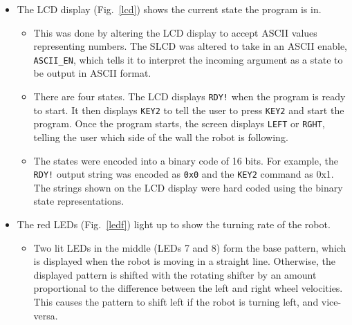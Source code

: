 \begin{itemize}
\item The LCD display (Fig.~\ref{lcd}) shows the current state the program is in.
  \begin{itemize}
  \item This was done by altering the LCD display to accept ASCII
    values representing numbers. The SLCD was altered to take in an
    ASCII enable, \verb+ASCII_EN+, which tells it to interpret the
    incoming argument as a state to be output in ASCII format.
  \item There are four states. The LCD displays \verb+RDY!+ when the
    program is ready to start. It then displays \verb+KEY2+ to tell
    the user to press \verb+KEY2+ and start the program. Once the
    program starts, the screen displays \verb+LEFT+ or \verb+RGHT+,
    telling the user which side of the wall the robot is following.
  \item The states were encoded into a binary code of 16 bits. For
    example, the \verb+RDY!+ output string was encoded as \verb+0x0+ and the
    \verb+KEY2+ command as 0x1. The strings shown on the LCD display
    were hard coded using the binary state representations.
  \end{itemize}

\begin{figure}[h!]
  \centering \cprotect {}
\end{figure}

\item The red LEDs (Fig.~\ref{ledf}) light up to show the turning rate
  of the robot.
  \begin{itemize}
  \item Two lit LEDs in the middle (LEDs 7 and 8) form the base
    pattern, which is displayed when the robot is moving in a straight
    line. Otherwise, the displayed pattern is shifted with the
    rotating shifter by an amount proportional to the difference
    between the left and right wheel velocities. This causes the pattern
    to shift left if the robot is turning left, and vice-versa.
  \end{itemize}


\end{itemize}
